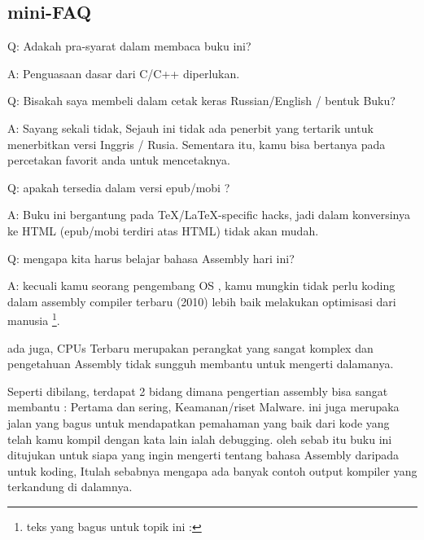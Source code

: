 \subsection*{mini-FAQ}


\par Q: Adakah pra-syarat dalam membaca buku ini?
\par A: Penguasaan dasar dari  C/C++ diperlukan.

\par Q: Bisakah saya membeli dalam cetak keras Russian/English / bentuk Buku?
\par A: Sayang sekali tidak, Sejauh ini tidak ada penerbit yang tertarik untuk menerbitkan versi Inggris / Rusia.
Sementara itu, kamu bisa bertanya pada percetakan favorit anda untuk mencetaknya.

\par Q: apakah tersedia dalam versi epub/mobi ?
\par A: Buku ini bergantung pada TeX/LaTeX-specific hacks, jadi dalam konversinya ke HTML (epub/mobi terdiri atas HTML)
tidak akan mudah.

\par Q: mengapa kita harus belajar bahasa Assembly hari ini?
\par A: kecuali kamu seorang pengembang \ac{OS} , kamu mungkin tidak perlu koding dalam assembly\textemdash{} compiler terbaru (2010) lebih baik melakukan optimisasi dari manusia \footnote{teks yang bagus untuk topik ini : \InSqBrackets{\AgnerFog}}.

ada juga, \ac{CPU}s Terbaru merupakan perangkat yang sangat komplex dan pengetahuan Assembly tidak sungguh membantu untuk mengerti dalamanya.

Seperti dibilang, terdapat 2 bidang dimana pengertian assembly bisa sangat membantu : 
Pertama dan sering, Keamanan/riset Malware. ini juga merupaka jalan yang bagus untuk mendapatkan pemahaman yang baik dari kode yang telah kamu kompil dengan kata lain ialah debugging.
oleh sebab itu buku ini ditujukan untuk siapa yang ingin mengerti tentang bahasa Assembly daripada 
untuk koding, Itulah sebabnya mengapa ada banyak contoh output kompiler yang terkandung di dalamnya.

